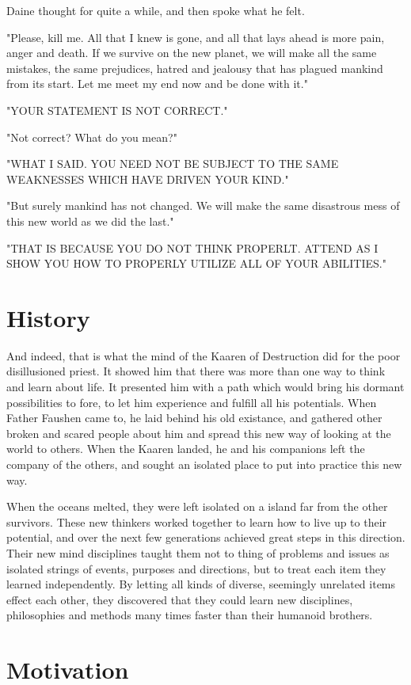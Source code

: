 Daine thought for quite a while, and then spoke what he felt.

"Please, kill me. All that I knew is gone, and all that lays ahead is more pain, anger and death. If we survive on the new planet, we will make all the same mistakes, the same prejudices, hatred and jealousy that has plagued mankind from its start. Let me meet my end now and be done with it."

"YOUR STATEMENT IS NOT CORRECT."

"Not correct? What do you mean?"

"WHAT I SAID. YOU NEED NOT BE SUBJECT TO THE SAME WEAKNESSES WHICH HAVE DRIVEN YOUR KIND."

"But surely mankind has not changed. We will make the same disastrous mess of this new world as we did the last."

"THAT IS BECAUSE YOU DO NOT THINK PROPERLT. ATTEND AS I SHOW YOU HOW TO PROPERLY UTILIZE ALL OF YOUR ABILITIES."

\section{History}

And indeed, that is what the mind of the Kaaren of Destruction did for the poor disillusioned priest. It showed him that there was more than one way to think and learn about life. It presented him with a path which would bring his dormant possibilities to fore, to let him experience and fulfill all his potentials. When Father Faushen came to, he laid behind his old existance, and gathered other broken and scared people about him and spread this new way of looking at the world to others. When the Kaaren landed, he and his companions left the company of the others, and sought an isolated place to put into practice this new way.

When the oceans melted, they were left isolated on a island far from the other survivors. These new thinkers worked together to learn how to live up to their potential, and over the next few generations achieved great steps in this direction. Their new mind disciplines taught them not to thing of problems and issues as isolated strings of events, purposes and directions, but to treat each item they learned independently. By letting all kinds of diverse, seemingly unrelated items effect each other, they discovered that they could learn new disciplines, philosophies and methods many times faster than their humanoid brothers.

\section{Motivation}

